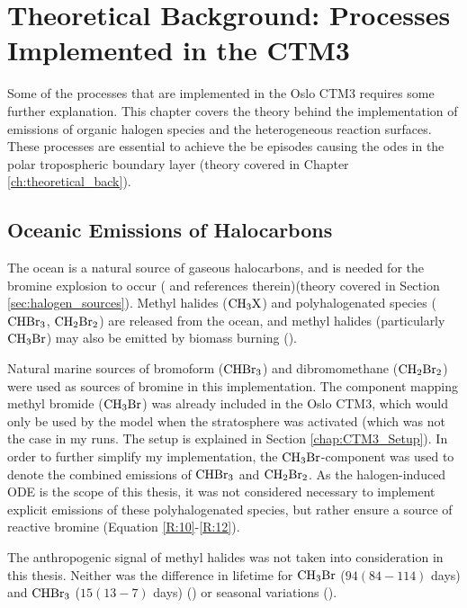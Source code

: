\setcounter{chapter}{4} 
\chapter{Theoretical Background: Processes Implemented in the CTM3}\label{Chap:CTM3theory_ocean_hetReact}

Some of the processes that are implemented in the Oslo CTM3 requires some further explanation. This chapter covers the theory behind the implementation of emissions of organic halogen species and the heterogeneous reaction surfaces. These processes are essential to achieve the \acrfull{be} episodes causing the \acrfull{ode}s in the polar tropospheric boundary layer (theory covered in Chapter \ref{ch:theoretical_back}).

\section{Oceanic Emissions of Halocarbons}\label{sec:oceanic_emissions}


The ocean is a natural source of gaseous halocarbons, and is needed for the bromine explosion to occur (\cite{Schmidt} and references therein)(theory covered in Section \ref{sec:halogen_sources}). Methyl halides ($\mathrm{CH_3X}$) and polyhalogenated species ($\mathrm{CHBr_3}$, $\mathrm{CH_2Br_2}$) are released from the ocean, and methyl halides (particularly $\mathrm{CH_3Br}$) may also be emitted by biomass burning (\cite{SeinfeldSpyros}). 

\medskip

Natural marine sources of bromoform ($\mathrm{CHBr_3}$) and dibromomethane ($\mathrm{CH_2Br_2}$) were used as sources of bromine in this implementation. The component mapping methyl bromide ($\mathrm{CH_3Br}$) was already included in the Oslo CTM3, which would only be used by the model when the stratosphere was activated (which was not the case in my runs. The setup is explained in Section \ref{chap:CTM3_Setup}). In order to further simplify my implementation, the $\mathrm{CH_3Br}$-component was used to denote the combined emissions of $\mathrm{CHBr_3}$ and $\mathrm{CH_2Br_2}$. As the halogen-induced ODE is the scope of this thesis, it was not considered necessary to implement explicit emissions of these polyhalogenated species, but rather ensure a source of reactive bromine (Equation \ref{R:10}-\ref{R:12}).


\medskip

The anthropogenic signal of methyl halides was not taken into consideration in this thesis. Neither was the difference in lifetime for $\mathrm{CH_3Br}$ ($94 (84-114)$ days) and $\mathrm{CHBr_3}$ ($15 (13-7)$ days) (\cite{Hossaini2016_chlorine}) or seasonal variations (\cite{Liang2010}). 


